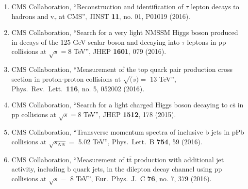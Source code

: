 \begin{enumerate}
\item CMS Collaboration, ``Reconstruction and identification of $\tau$ lepton decays to hadrons and v$_\tau$ at CMS'', JINST {\bf 11}, no. 01, P01019 (2016).

\item CMS Collaboration, ``Search for a very light NMSSM Higgs boson produced in decays of the 125 GeV scalar boson and decaying into $\tau$ leptons in pp collisions at $\sqrt{s}=8$ TeV'', JHEP {\bf 1601}, 079 (2016).

\item CMS Collaboration, ``Measurement of the top quark pair production cross section in proton-proton collisions at $\sqrt(s) =$ 13 TeV'', Phys.\ Rev.\ Lett.\  {\bf 116}, no. 5, 052002 (2016).

\item CMS Collaboration, ``Search for a light charged Higgs boson decaying to $ \mathrm{c}\overline{\mathrm{s}} $ in pp collisions at $ \sqrt{s}=8 $ TeV'', JHEP {\bf 1512}, 178 (2015).

\item CMS Collaboration, ``Transverse momentum spectra of inclusive b jets in pPb collisions at $\sqrt{s_{NN}} = $ 5.02 TeV'', Phys.\ Lett.\ B {\bf 754}, 59 (2016).

\item CMS Collaboration, ``Measurement of $\mathrm {t}\overline{\mathrm {t}}$ production with additional jet activity, including $\mathrm {b}$ quark jets, in the dilepton decay channel using pp collisions at $\sqrt{s} =$ 8 TeV'', Eur.\ Phys.\ J.\ C {\bf 76}, no. 7, 379 (2016).


\end{enumerate}
